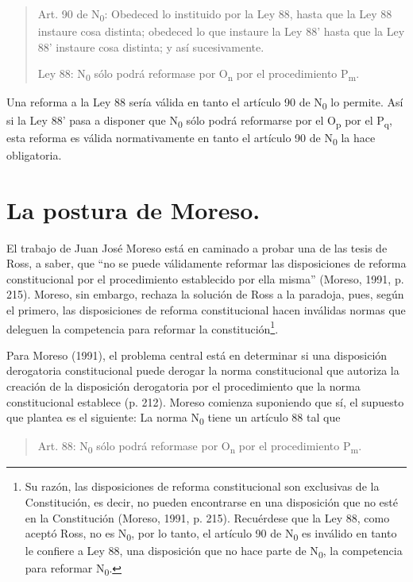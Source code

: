 \documentclass[]{book}
\begin{document}
\begin{refsection}
\begin{quote}
Art. 90 de N\textsubscript{0}: Obedeced lo instituido por la Ley 88,
hasta que la Ley 88 instaure cosa distinta; obedeced lo que instaure la
Ley 88' hasta que la Ley 88' instaure cosa distinta; y así
sucesivamente.

Ley 88: N\textsubscript{0} sólo podrá reformase por O\textsubscript{n}
por el procedimiento P\textsubscript{m}.
\end{quote}

Una reforma a la Ley 88 sería válida en tanto el artículo 90 de
N\textsubscript{0} lo permite. Así si la Ley 88' pasa a disponer que
N\textsubscript{0} sólo podrá reformarse por el O\textsubscript{p} por
el P\textsubscript{q}, esta reforma es válida normativamente en tanto el
artículo 90 de N\textsubscript{0} la hace obligatoria.

\section*{La postura de Moreso.}

El trabajo de Juan José Moreso está en caminado a probar una de las
tesis de Ross, a saber, que ``no se puede válidamente reformar las
disposiciones de reforma constitucional por el procedimiento establecido
por ella misma'' (Moreso, 1991, p. 215). Moreso, sin embargo, rechaza la
solución de Ross a la paradoja, pues, según el primero, las
disposiciones de reforma constitucional hacen inválidas normas que
deleguen la competencia para reformar la constitución\footnote{Su razón,
  las disposiciones de reforma constitucional son exclusivas de la
  Constitución, es decir, no pueden encontrarse en una disposición que
  no esté en la Constitución (Moreso, 1991, p. 215). Recuérdese que la
  Ley 88, como aceptó Ross, no es N\textsubscript{0}, por lo tanto, el
  artículo 90 de N\textsubscript{0} es inválido en tanto le confiere a
  Ley 88, una disposición que no hace parte de N\textsubscript{0}, la
  competencia para reformar N\textsubscript{0}.}.

Para Moreso (1991), el problema central está en determinar si una
disposición derogatoria constitucional puede derogar la norma
constitucional que autoriza la creación de la disposición derogatoria
por el procedimiento que la norma constitucional establece (p. 212).
Moreso comienza suponiendo que sí, el supuesto que plantea es el
siguiente: La norma N\textsubscript{0} tiene un artículo 88 tal que

\begin{quote}
Art. 88: N\textsubscript{0} sólo podrá reformase por O\textsubscript{n}
por el procedimiento P\textsubscript{m}.
\end{quote}


\end{refsection}
\end{document}
